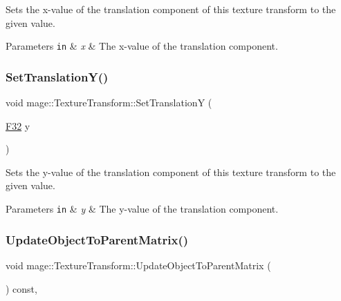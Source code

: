 Sets the x-\/value of the translation component of this texture transform to the given value.


\begin{DoxyParams}[1]{Parameters}
\mbox{\tt in}  & {\em x} & The x-\/value of the translation component. \\
\hline
\end{DoxyParams}
\hypertarget{classmage_1_1_texture_transform_a3c8d11ee771bab59e7960c616ff7261e}{}\label{classmage_1_1_texture_transform_a3c8d11ee771bab59e7960c616ff7261e} 
\subsubsection{\texorpdfstring{Set\+Translation\+Y()}{SetTranslationY()}}
{\footnotesize\ttfamily void mage\+::\+Texture\+Transform\+::\+Set\+TranslationY (\begin{DoxyParamCaption}\item[{\hyperlink{namespacemage_aa97e833b45f06d60a0a9c4fc22ae02c0}{F32}}]{y }\end{DoxyParamCaption})\hspace{0.3cm}{\ttfamily [noexcept]}}

Sets the y-\/value of the translation component of this texture transform to the given value.


\begin{DoxyParams}[1]{Parameters}
\mbox{\tt in}  & {\em y} & The y-\/value of the translation component. \\
\hline
\end{DoxyParams}
\hypertarget{classmage_1_1_texture_transform_a9c57bc18eead3ce17265ae9cd3a7a8c7}{}\label{classmage_1_1_texture_transform_a9c57bc18eead3ce17265ae9cd3a7a8c7} 
\subsubsection{\texorpdfstring{Update\+Object\+To\+Parent\+Matrix()}{UpdateObjectToParentMatrix()}}
{\footnotesize\ttfamily void mage\+::\+Texture\+Transform\+::\+Update\+Object\+To\+Parent\+Matrix (\begin{DoxyParamCaption}{ }\end{DoxyParamCaption}) const\hspace{0.3cm}{\ttfamily [private]}, {\ttfamily [noexcept]}}

